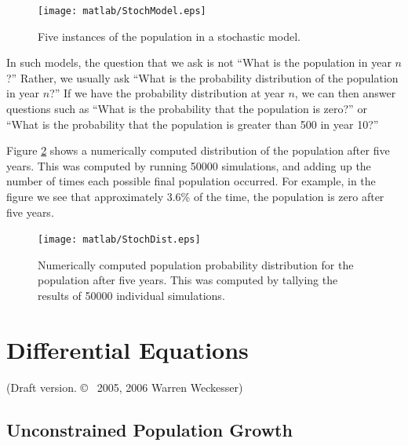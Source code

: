 \documentclass[reqno]{immbook}
\numberwithin{equation}{chapter}
\numberwithin{question}{section}
\numberwithin{theorem}{chapter}
\numberwithin{figure}{chapter}
\theoremstyle{definition}
\begin{document}
\begin{figure}
\centerline{\texttt{[image: matlab/StochModel.eps]}}
\caption{Five instances of the population in 
a stochastic model.}
\label{fig:StochModel}
\end{figure}

In such models, the question that we ask is not
``What is the population in year $n$?''
Rather, we usually ask ``What is the probability
distribution of the population in year $n$?''
If we have the probability distribution at year
$n$, we can then answer questions such as
``What is the probability that the population is zero?''
or ``What is the probability that the population is
greater than 500 in year 10?''

Figure \ref{fig:StochDist} shows a numerically
computed distribution of the population after
five years. This was computed by running 50000
simulations, and adding up the number of times
each possible final population occurred.
For example, in the figure we see that
approximately 3.6\% of the time, the population
is zero after five years.

\begin{figure}
\centerline{\texttt{[image: matlab/StochDist.eps]}}
\caption{Numerically computed population
probability distribution for the population
after five years.  This was computed by
tallying the results of 50000 individual
simulations.}
\label{fig:StochDist}
\end{figure}


\chapter{Differential Equations}

\centerline{(Draft version. \copyright ~ 2005, 2006 Warren Weckesser)}
\bigskip


\section{Unconstrained Population Growth}
\end{document}
